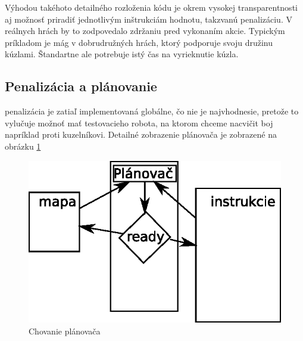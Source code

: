 Výhodou takéhoto detailného rozloženia kódu je okrem vysokej transparentnosti aj možnosť priradiť jednotlivým inštrukciám hodnotu, takzvanú penalizáciu. V reálnych hrách by to zodpovedalo zdržaniu pred vykonaním akcie. Typickým príkladom je mág v dobrudružných hrách, ktorý podporuje svoju družinu kúzlami. Štandartne ale potrebuje istý čas na vyrieknutie kúzla.\\
\subsection{Penalizácia a plánovanie}
penalizácia je zatiaľ implementovaná globálne, čo nie je najvhodnesie, pretože to vylučuje možnoť mať testovacieho robota, na ktorom chceme nacvičit boj napríklad proti kuzelníkovi. Detailné zobrazenie plánovača je zobrazené na obrázku \ref{fig:sch}
\begin{figure}
\centering
\includegraphics{planovac}
\caption{Chovanie plánovača}
\label{fig:sch}
\end{figure}
